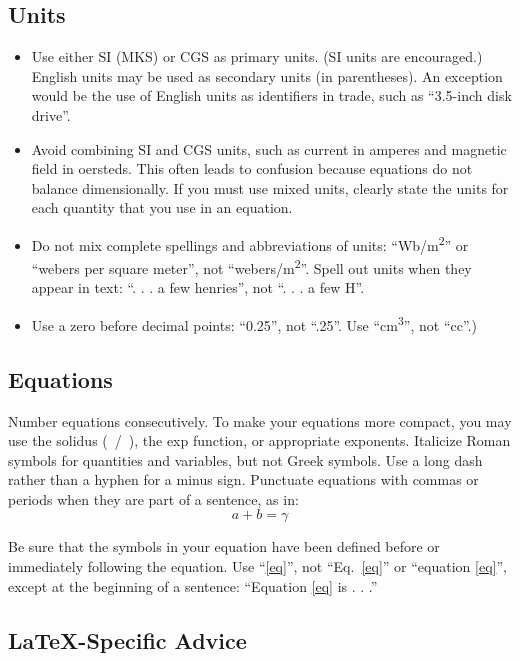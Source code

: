 \documentclass[conference, one column]{IEEEtran}
\begin{document}
\subsection{Units}
\begin{itemize}
\item Use either SI (MKS) or CGS as primary units. (SI units are encouraged.) English units may be used as secondary units (in parentheses). An exception would be the use of English units as identifiers in trade, such as ``3.5-inch disk drive''.
\item Avoid combining SI and CGS units, such as current in amperes and magnetic field in oersteds. This often leads to confusion because equations do not balance dimensionally. If you must use mixed units, clearly state the units for each quantity that you use in an equation.
\item Do not mix complete spellings and abbreviations of units: ``Wb/m\textsuperscript{2}'' or ``webers per square meter'', not ``webers/m\textsuperscript{2}''. Spell out units when they appear in text: ``. . . a few henries'', not ``. . . a few H''.
\item Use a zero before decimal points: ``0.25'', not ``.25''. Use ``cm\textsuperscript{3}'', not ``cc''.)
\end{itemize}

\subsection{Equations}
Number equations consecutively. To make your 
equations more compact, you may use the solidus (~/~), the exp function, or 
appropriate exponents. Italicize Roman symbols for quantities and variables, 
but not Greek symbols. Use a long dash rather than a hyphen for a minus 
sign. Punctuate equations with commas or periods when they are part of a 
sentence, as in:
\begin{equation}
a+b=\gamma\label{eq}
\end{equation}

Be sure that the 
symbols in your equation have been defined before or immediately following 
the equation. Use ``\eqref{eq}'', not ``Eq.~\eqref{eq}'' or ``equation \eqref{eq}'', except at 
the beginning of a sentence: ``Equation \eqref{eq} is . . .''

\subsection{\LaTeX-Specific Advice}
\end{document}
